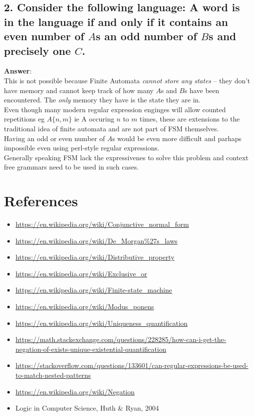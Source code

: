 \documentclass[a4paper, 14pt]{report}
\newcommand{\answer}[1]{%
	\begin{flushleft}
		\textbf{Answer}:\\
			#1
	\end{flushleft}}
\newcommand{\question}[1]{\subsection*{#1}}
\begin{document}
\question{2. Consider the following language: A word is in the language if
  and only if it contains an even number of $A$s an odd number of $B$s and precisely one $C$.}

\answer{This is not possible because Finite Automata \textit{cannot store any states}
	-- they don't have memory and cannot keep track of how many $A$s
	and $B$s have been encountered. The \textit{only} memory they have is the
	state they are in.  \\
	Even though many modern regular expression enginges will allow
	counted repetitions eg $A\{n,m\}$ ie A occuring $n$ to $m$ times,
	these are extensions to the traditional idea of finite automata
	and are not part of FSM themselves. \\ 
	Having an odd or even number of $A$s would be even more difficult
	and parhaps impossible even using perl-style regular expressions. \\
	Generally speaking FSM lack the expressivenes to solve this problem
	and context free grammars need to be used in such cases.}

\hline

\section*{References}

\begin{flushleft}
	\begin{itemize}[noitemsep]
		\item \url{https://en.wikipedia.org/wiki/Conjunctive_normal_form}
		\item \url{https://en.wikipedia.org/wiki/De_Morgan\%27s_laws}
		\item \url{https://en.wikipedia.org/wiki/Distributive_property}
		\item \url{https://en.wikipedia.org/wiki/Exclusive_or}
		\item \url{https://en.wikipedia.org/wiki/Finite-state_machine}
		\item \url{https://en.wikipedia.org/wiki/Modus_ponens}
		\item \url{https://en.wikipedia.org/wiki/Uniqueness_quantification}
		\item \url{https://math.stackexchange.com/questions/228285/how-can-i-get-the-negation-of-exists-unique-existential-quantification}
		\item \url{https://stackoverflow.com/questions/133601/can-regular-expressions-be-used-to-match-nested-patterns}
		\item \url{https://en.wikipedia.org/wiki/Negation}
		\item Logic in Computer Science, Huth \& Ryan, 2004
	\end{itemize}		
\end{flushleft}
\end{document}
